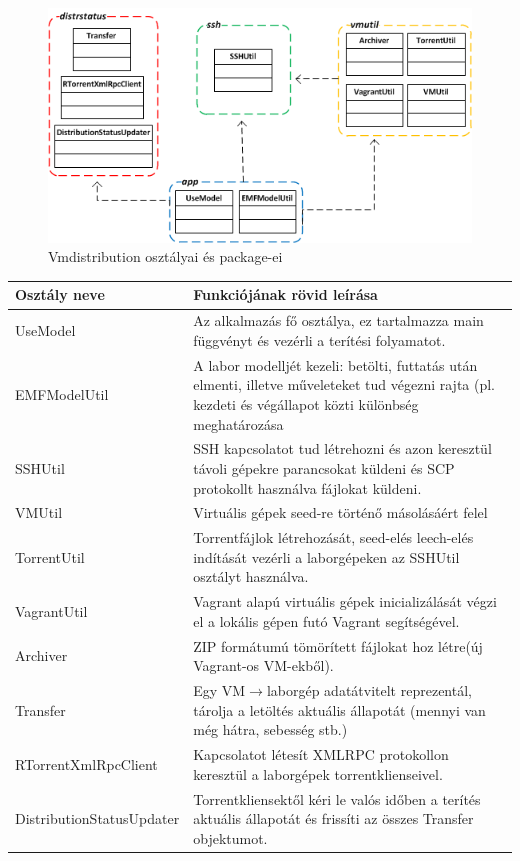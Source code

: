 \begin{figure}[ht]
\centering
\includegraphics[width=150mm, keepaspectratio]{figures/packagediag.png}
\caption{Vmdistribution osztályai és package-ei}
\label{fig:packagediag}
\end{figure}

\begin{center}
	\begin{tabular}{|>{\centering\arraybackslash}m{45mm}|>{\centering\arraybackslash}m{95mm}|}
		\hline
		\textbf{Osztály neve}&\textbf{Funkciójának rövid leírása}\\
		\hline
		UseModel & Az alkalmazás fő osztálya, ez tartalmazza main függvényt és vezérli a terítési folyamatot.\\ 
		\hline
		EMFModelUtil & A labor modelljét kezeli: betölti, futtatás után elmenti, illetve műveleteket tud végezni rajta (pl. kezdeti és végállapot közti különbség meghatározása\\
		\hline
		\hline
		SSHUtil & SSH kapcsolatot tud létrehozni és azon keresztül távoli gépekre parancsokat küldeni és SCP protokollt használva fájlokat küldeni.\\
		\hline
		\hline
		VMUtil &  Virtuális gépek seed-re történő másolásáért felel\\
		\hline
		TorrentUtil &Torrentfájlok létrehozását, seed-elés leech-elés indítását vezérli a laborgépeken az SSHUtil osztályt használva. \\
		\hline
		VagrantUtil & Vagrant alapú virtuális gépek inicializálását végzi el a lokális gépen futó Vagrant segítségével.\\
		\hline
		Archiver & ZIP formátumú tömörített fájlokat hoz létre(új Vagrant-os VM-ekből).\\
		\hline
		\hline
		Transfer & Egy VM$\rightarrow$laborgép adatátvitelt reprezentál, tárolja a letöltés aktuális állapotát (mennyi van még hátra, sebesség stb.)\\
		\hline
		RTorrentXmlRpcClient & Kapcsolatot létesít XMLRPC protokollon keresztül a laborgépek torrentklienseivel.\\
		\hline
		DistributionStatusUpdater & Torrentkliensektől kéri le valós időben a terítés aktuális állapotát és frissíti az összes Transfer objektumot.\\
		\hline
	\end{tabular}
\end{center}

